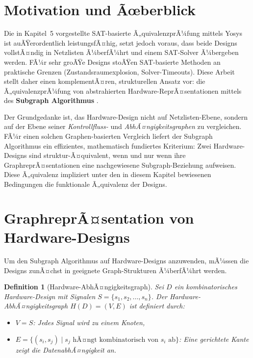 ﻿\documentclass[12pt,a4paper]{report}
\newtheorem{definition}{Definition}[section]
\begin{document}
\section{Motivation und Ãœberblick}

Die in Kapitel~5 vorgestellte SAT-basierte Ã„quivalenzprÃ¼fung mittels Yosys ist auÃŸerordentlich leistungsfÃ¤hig, setzt jedoch voraus, dass beide Designs vollstÃ¤ndig in Netzlisten Ã¼berfÃ¼hrt und einem SAT-Solver Ã¼bergeben werden. FÃ¼r sehr groÃŸe Designs stoÃŸen SAT-basierte Methoden an praktische Grenzen (Zustandsraumexplosion, Solver-Timeouts). Diese Arbeit stellt daher einen komplementÃ¤ren, strukturellen Ansatz vor: die Ã„quivalenzprÃ¼fung von abstrahierten Hardware-ReprÃ¤sentationen mittels des \textbf{Subgraph Algorithmus} \cite{subgraph2026}.

Der Grundgedanke ist, das Hardware-Design nicht auf Netzlisten-Ebene, sondern auf der Ebene seiner \emph{Kontrollfluss-} und \emph{AbhÃ¤ngigkeitsgraphen} zu vergleichen. FÃ¼r einen solchen Graphen-basierten Vergleich liefert der Subgraph Algorithmus ein effizientes, mathematisch fundiertes Kriterium: Zwei Hardware-Designs sind struktur-Ã¤quivalent, wenn und nur wenn ihre GraphreprÃ¤sentationen eine nachgewiesene Subgraph-Beziehung aufweisen. Diese Ã„quivalenz impliziert unter den in diesem Kapitel bewiesenen Bedingungen die funktionale Ã„quivalenz der Designs.

\section{GraphreprÃ¤sentation von Hardware-Designs}
\label{subsec:graph_repr}

Um den Subgraph Algorithmus auf Hardware-Designs anzuwenden, mÃ¼ssen die Designs zunÃ¤chst in geeignete Graph-Strukturen Ã¼berfÃ¼hrt werden.

\begin{definition}[Hardware-AbhÃ¤ngigkeitsgraph]
\label{def:hdg}
Sei $D$ ein kombinatorisches Hardware-Design mit Signalen $S = \{s_1, s_2, \ldots, s_n\}$. Der \emph{Hardware-AbhÃ¤ngigkeitsgraph} $H(D) = (V, E)$ ist definiert durch:
\begin{itemize}
    \item $V = S$: Jedes Signal wird zu einem Knoten,
    \item $E = \{(s_i, s_j) \mid s_j \text{ hÃ¤ngt kombinatorisch von } s_i \text{ ab}\}$: Eine gerichtete Kante zeigt die DatenabhÃ¤ngigkeit an.
\end{itemize}
\end{definition}
\end{document}
